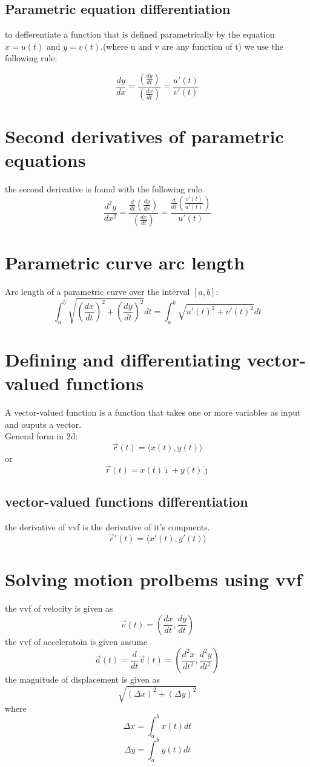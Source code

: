 \documentclass{article}
\begin{document}
                    \subsection{Parametric equation differentiation}
                        to defferentiate a function that is defined parametrically by the equation \(x = u(t)\) and \(y = v(t)\).\space(where u and v are any function of t) we use the following rule: 

                        \[\frac{dy}{dx} = \frac{\left(\frac{dy}{dt}\right)}{\left(\frac{dx}{dt}\right)} = \frac{u'(t)}{v'(t)}\]
                \section{Second derivatives of parametric equations}
                    the second derivative is found with the following rule. 
                    \[\frac{d^2y}{dx^2} = \frac{\frac{d}{dt} (\frac{dy}{dx})}{(\frac{dx}{dt})} = \frac{\frac{d}{dt}(\frac{v'(t)}{u'(t)})}{u'(t)}\]
                \section{Parametric curve arc length}
                    Arc length of a parametric curve over the interval \([a, b]\): 
                    \[\int_{a}^{b} \sqrt{{(\frac{dx}{dt})}^2 + {(\frac{dy}{dt})}^2} dt = \int_{a}^{b} \sqrt{{u'(t)}^2 + {v'(t)}^2} dt\]
                \section{Defining and differentiating vector-valued functions}
                    A vector-valued function is a function that takes one or more variables as input and ouputs a vector.\\
                    General form in 2d: 
                    \[\vec{r}(t) = \langle x(t), y(t) \rangle \]                
                    or 
                    \[\vec{r}(t) = x(t)\hat{\imath} + y(t)\hat{\jmath}\]
                    \subsection{vector-valued functions differentiation}
                    the derivative of vvf is the derivative of it's compnents. 
                         \[\vec{r}  '(t) = \langle x'(t), y'(t) \rangle \] 
                \section{Solving motion prolbems using vvf}
                    the vvf of velocity is given as  
                    \[\vec{v}(t) = (\frac{dx}{dt}, \frac{dy}{dt})\]
                    the vvf of acceleratoin is given assume
                    \[\vec{a}(t)= \frac{d}{dt}\vec{v}(t) = (\frac{d^2x}{dt^2}, \frac{d^2y}{dt^2})\]
                    the magnitude of displacement is given as 
                    \[\sqrt{{(\Delta x)}^2 + {(\Delta y)}^2 }\]
                    where 
                    \[\Delta x = \int_{a}^{b} x(t)dt\]
                    \[\Delta y = \int_{a}^{b} y(t)dt\]
\end{document}
